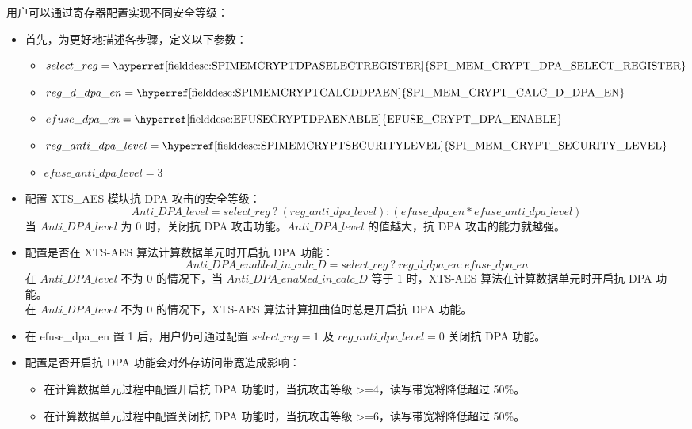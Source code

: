 \documentclass[main\_\_CN.tex]{subfiles}
\begin{document}
用户可以通过寄存器配置实现不同安全等级：
\begin{itemize}
    \item 首先，为更好地描述各步骤，定义以下参数：
    \begin{itemize}
        \item $select\_reg     = \textrm{\hyperref[fielddesc:SPIMEMCRYPTDPASELECTREGISTER]{SPI\_MEM\_CRYPT\_DPA\_SELECT\_REGISTER}}$
        \item $reg\_d\_dpa\_en = \textrm{\hyperref[fielddesc:SPIMEMCRYPTCALCDDPAEN]{SPI\_MEM\_CRYPT\_CALC\_D\_DPA\_EN}}$
        \item $efuse\_dpa\_en  = \textrm{\hyperref[fielddesc:EFUSECRYPTDPAENABLE]{EFUSE\_CRYPT\_DPA\_ENABLE}}$
        \item $reg\_anti\_dpa\_level = \textrm{\hyperref[fielddesc:SPIMEMCRYPTSECURITYLEVEL]{SPI\_MEM\_CRYPT\_SECURITY\_LEVEL}}$
        \item $efuse\_anti\_dpa\_level = \textrm{3}$
    \end{itemize}
    \item 配置 XTS\_AES 模块抗 DPA 攻击的安全等级：
    $$ Anti\_DPA\_level = select\_reg \ ?\  (reg\_anti\_dpa\_level) : (efuse\_dpa\_en * efuse\_anti\_dpa\_level) $$
    当 $Anti\_DPA\_level$ 为 0 时，关闭抗 DPA 攻击功能。$Anti\_DPA\_level$ 的值越大，抗 DPA 攻击的能力就越强。
    \item 配置是否在 XTS-AES 算法计算数据单元时开启抗 DPA 功能：
    $$ Anti\_DPA\_enabled\_in\_calc\_D = select\_reg \ ? \ reg\_d\_dpa\_en : efuse\_dpa\_en $$
    在 $Anti\_DPA\_level$ 不为 0 的情况下，当 $ Anti\_DPA\_enabled\_in\_calc\_D $ 等于 1 时，XTS-AES 算法在计算数据单元时开启抗 DPA 功能。\\
    在 $Anti\_DPA\_level$ 不为 0 的情况下，XTS-AES 算法计算扭曲值时总是开启抗 DPA 功能。
\end{itemize}


\begin{tiplisting}
\vspace{-2.5em}
\begin{itemize}
    \item 在 efuse\_dpa\_en 置 1 后，用户仍可通过配置 $select\_reg = 1$ 及 $reg\_anti\_dpa\_level = 0$ 关闭抗 DPA 功能。
    \item 配置是否开启抗 DPA 功能会对外存访问带宽造成影响：
        \begin{itemize}
            \item 在计算数据单元过程中配置开启抗 DPA 功能时，当抗攻击等级 >=4，读写带宽将降低超过 50\%。
            \item 在计算数据单元过程中配置关闭抗 DPA 功能时，当抗攻击等级 >=6，读写带宽将降低超过 50\%。
        \end{itemize}
\end{itemize}


\end{tiplisting}
\end{document}
